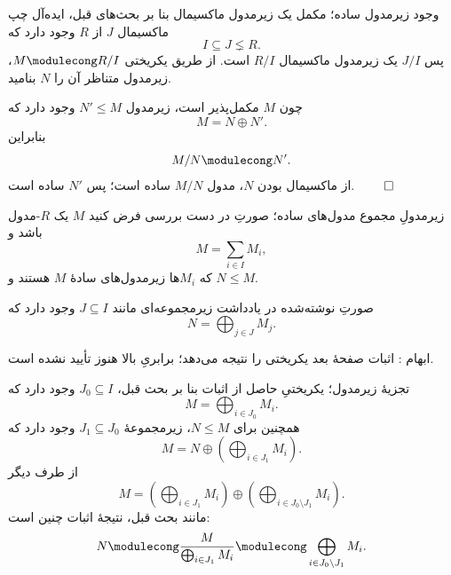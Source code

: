 \begin{frame}[t]{وجود زیرمدول ساده؛ مکمل یک زیرمدول ماکسیمال}
    \label{lec06:simple-submodule-complement}
    بنا بر بحث‌های قبل، ایده‌آل چپ ماکسیمال \(J\) از \(R\) وجود دارد که
    \[
        I\subseteq J\lneq R.
    \]
    پس \(J/I\) یک زیرمدول ماکسیمال \(R/I\) است.
    از طریق یکریختی \(M\modulecong R/I\)، زیرمدول متناظر آن را \(N\) بنامید.

    چون \(M\) مکمل‌پذیر است، زیرمدول \(N'\leqslant M\) وجود دارد که
    \[
        M=N\oplus N'.
    \]
    بنابراین
    \[
        M/N\modulecong N'.
    \]
    از ماکسیمال بودن \(N\)، مدول \(M/N\) ساده است؛ پس \(N'\) ساده است.
    \hfill\(\qed\)
\end{frame}

\begin{frame}[t]{زیرمدولِ مجموع مدول‌های ساده؛ صورتِ در دست بررسی}
    \label{lec06:submodule-decomposition-pending}
    فرض کنید \(M\) یک \(R\)-مدول باشد و
    \[
        M=\sum_{i\in I}M_i,
    \]
    که \(M_i\)ها زیرمدول‌های سادهٔ \(M\) هستند و \(N\leqslant M\).
    \begin{block}{صورتِ نوشته‌شده در یادداشت}
        زیرمجموعه‌ای مانند \(J\subseteq I\) وجود دارد که
        \[
            N=\bigoplus_{j\in J}M_j.
        \]
    \end{block}
    \alert{ابهام : اثبات صفحهٔ بعد یکریختی را نتیجه می‌دهد؛ برابریِ بالا هنوز تأیید نشده است.}
\end{frame}

\begin{frame}[t]{تجزیهٔ زیرمدول؛ یکریختیِ حاصل از اثبات}
    \label{lec06:submodule-decomposition-proof}
    بنا بر بحث قبل، \(J_0\subseteq I\) وجود دارد که
    \[
        M=\bigoplus_{i\in J_0}M_i.
    \]
    همچنین برای \(N\leqslant M\)، زیرمجموعهٔ \(J_1\subseteq J_0\) وجود دارد که
    \[
        M=N\oplus\left(\bigoplus_{i\in J_1}M_i\right).
    \]
    از طرف دیگر
    \[
        M=\left(\bigoplus_{i\in J_1}M_i\right)
          \oplus\left(\bigoplus_{i\in J_0\setminus J_1}M_i\right).
    \]
    مانند بحث قبل، نتیجهٔ اثبات چنین است:
    \[
        N\modulecong\frac{M}{\bigoplus_{i\in J_1}M_i}
          \modulecong\bigoplus_{i\in J_0\setminus J_1}M_i.
    \]
\end{frame}

